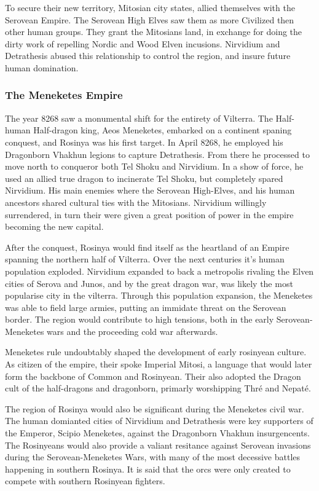 \documentclass[../main.tex]{subfiles}
\begin{document}
To secure their new territory, Mitosian city states, allied themselves with the Serovean Empire. The Serovean High
Elves saw them as more Civilized then other human groups. They grant the Mitosians land, in exchange for doing 
the dirty work of repelling Nordic and Wood Elven incusions. Nirvidium and Detrathesis abused this relationship
to control the region, and insure future human domination.  

\subsubsection{The Meneketes Empire}
The year 8268 saw a monumental shift for the entirety of Vilterra. The Half-human Half-dragon king, Aeos Meneketes,
embarked on a continent spaning conquest, and Rosinya was his first target. In April 8268, he employed his
Dragonborn Vhakhun legions to capture Detrathesis. From there he processed to move north to conqueror
both Tel Shoku and Nirvidium. In a show of force, he used an allied true dragon to incinerate Tel Shoku, but 
completely spared Nirvidium. His main enemies where the Serovean High-Elves, and his human ancestors shared cultural
ties with the Mitosians. Nirvidium willingly surrendered, in turn their were given a great position of power in the empire
becoming the new capital. 

After the conquest, Rosinya would find itself as the heartland of an Empire spanning the northern half of Vilterra.
Over the next centuries it's human population exploded. Nirvidium expanded to back a metropolis rivaling the Elven 
cities of Serova and Junos, and by the great dragon war, was likely the most popularise city in the vilterra. Through
this population expansion, the Meneketes was able to field large armies, putting an immidate threat on the Serovean border.
The region would contribute to high tensions, both in the early Serovean-Meneketes wars and the proceeding cold war afterwards.

Meneketes rule undoubtably shaped the development of early rosinyean culture. As citizen of the empire, their spoke
Imperial Mitosi, a language that would later form the backbone of Common and Rosinyean. Their also adopted the Dragon cult 
of the half-dragons and dragonborn, primarly worshipping Thré and Nepaté. 

The region of Rosinya would also be significant during the Meneketes civil war. The human domianted cities of Nirvidium and
Detrathesis were key supporters of the Emperor, Scipio Meneketes, against the Dragonborn Vhakhun insurgencents. The Rosinyeans would 
also provide a valiant resitance against Serovean invasions during the Serovean-Meneketes Wars, with many of the 
most decessive battles happening in southern Rosinya. It is said that the orcs were only created to compete with 
southern Rosinyean fighters.
\end{document}
